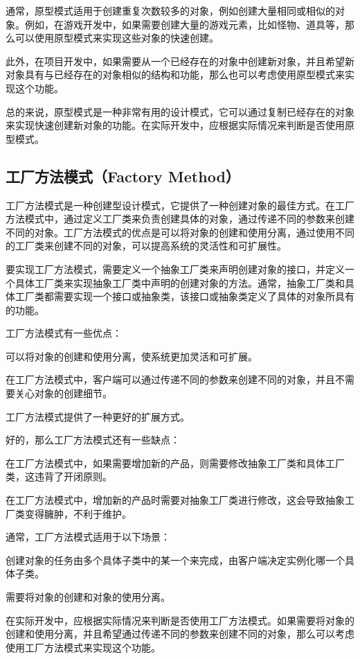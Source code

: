 \documentclass[cn,black,12pt,normal]{elegantnote}
\begin{document}
通常，原型模式适用于创建重复次数较多的对象，例如创建大量相同或相似的对象。例如，在游戏开发中，如果需要创建大量的游戏元素，比如怪物、道具等，那么可以使用原型模式来实现这些对象的快速创建。

此外，在项目开发中，如果需要从一个已经存在的对象中创建新对象，并且希望新对象具有与已经存在的对象相似的结构和功能，那么也可以考虑使用原型模式来实现这个功能。

总的来说，原型模式是一种非常有用的设计模式，它可以通过复制已经存在的对象来实现快速创建新对象的功能。在实际开发中，应根据实际情况来判断是否使用原型模式。


\subsection{工厂方法模式（Factory Method）}

工厂方法模式是一种创建型设计模式，它提供了一种创建对象的最佳方式。在工厂方法模式中，通过定义工厂类来负责创建具体的对象，通过传递不同的参数来创建不同的对象。工厂方法模式的优点是可以将对象的创建和使用分离，通过使用不同的工厂类来创建不同的对象，可以提高系统的灵活性和可扩展性。

要实现工厂方法模式，需要定义一个抽象工厂类来声明创建对象的接口，并定义一个具体工厂类来实现抽象工厂类中声明的创建对象的方法。通常，抽象工厂类和具体工厂类都需要实现一个接口或抽象类，该接口或抽象类定义了具体的对象所具有的功能。

工厂方法模式有一些优点：

可以将对象的创建和使用分离，使系统更加灵活和可扩展。

在工厂方法模式中，客户端可以通过传递不同的参数来创建不同的对象，并且不需要关心对象的创建细节。

工厂方法模式提供了一种更好的扩展方式。

好的，那么工厂方法模式还有一些缺点：

在工厂方法模式中，如果需要增加新的产品，则需要修改抽象工厂类和具体工厂类，这违背了开闭原则。

在工厂方法模式中，增加新的产品时需要对抽象工厂类进行修改，这会导致抽象工厂类变得臃肿，不利于维护。

通常，工厂方法模式适用于以下场景：

创建对象的任务由多个具体子类中的某一个来完成，由客户端决定实例化哪一个具体子类。

需要将对象的创建和对象的使用分离。

在实际开发中，应根据实际情况来判断是否使用工厂方法模式。如果需要将对象的创建和使用分离，并且希望通过传递不同的参数来创建不同的对象，那么可以考虑使用工厂方法模式来实现这个功能。
\end{document}
